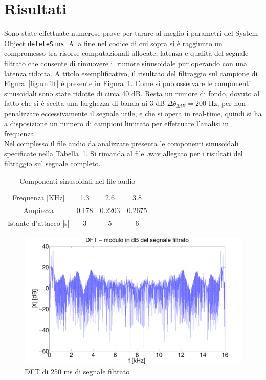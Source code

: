 \documentclass[10pt,A4]{article}
\begin{document}
\section{Risultati}
Sono state effettuate numerose prove per tarare al meglio i parametri del System Object \texttt{deleteSins}. Alla fine nel codice di cui sopra si è raggiunto un compromesso tra risorse computazionali allocate, latenza e qualità del segnale filtrato che consente di rimuovere il rumore sinusoidale pur operando con una latenza ridotta. A titolo esemplificativo, il risultato del filtraggio sul campione di Figura~\ref{fig:unfilt} è presente in Figura~\ref{fig:filt}. Come si può osservare le componenti sinusoidali sono state ridotte di circa 40 dB. Resta un rumore di fondo, dovuto al fatto che si è scelta una larghezza di banda ai 3 dB $\Delta\theta_{3dB} = 200$ Hz, per non penalizzare eccessivamente il segnale utile, e che si opera in real-time, quindi si ha a disposizione un numero di campioni limitato per effettuare l'analisi in frequenza. \\
Nel complesso il file audio da analizzare presenta le componenti sinusoidali specificate nella Tabella~\ref{table:sins}. Si rimanda al file .wav allegato per i risultati del filtraggio sul segnale completo.

\begin{table}[h]
  \centering
  \begin{tabular}{|c|c|c|c|}
    Frequenza [KHz]        & 1.3      &  2.6    &  3.8 \\
    Ampiezza               & 0.178    & 0.2203  & 0.2675  \\
    Istante d'attacco [s]  & 3        & 5       & 6  \\
  \end{tabular}
  \caption{Componenti sinusoidali nel file audio}
  \label{table:sins}
\end{table}
\flushleft

\begin{figure}[h]
  \centering
  \includegraphics[width = 1\textwidth, keepaspectratio]{images/DFTdBFiltered.pdf}
  \caption{DFT di 250 ms di segnale filtrato}
  \label{fig:filt}
\end{figure}
\end{document}
